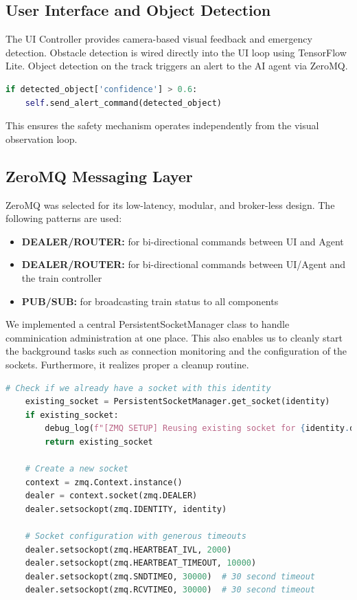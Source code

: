 \subsection{User Interface and Object Detection}

The UI Controller provides camera-based visual feedback and emergency detection. Obstacle detection is wired directly into the UI loop using TensorFlow Lite. Object detection on the track triggers an alert to the AI agent via ZeroMQ.

\begin{lstlisting}[language=Python, caption=Triggering alerts from UI]
if detected_object['confidence'] > 0.6:
    self.send_alert_command(detected_object)
\end{lstlisting}

This ensures the safety mechanism operates independently from the visual observation loop.

\subsection{ZeroMQ Messaging Layer}



ZeroMQ was selected for its low-latency, modular, and broker-less design. The following patterns are used:

\begin{itemize}
    \item \textbf{DEALER/ROUTER:} for bi-directional commands between UI and Agent
    \item \textbf{DEALER/ROUTER:} for bi-directional commands between UI/Agent and the train controller
    \item \textbf{PUB/SUB:} for broadcasting train status to all components
\end{itemize}

We implemented a central PersistentSocketManager class to handle comminication administration at  one place. This also enables us to cleanly start the background tasks such as connection monitoring and the configuration of the sockets. Furthermore, it realizes proper a cleanup routine.
\begin{lstlisting}[language=Python, caption=Snipped from socket manager]
# Check if we already have a socket with this identity
    existing_socket = PersistentSocketManager.get_socket(identity)
    if existing_socket:
        debug_log(f"[ZMQ SETUP] Reusing existing socket for {identity.decode()}")
        return existing_socket

    # Create a new socket
    context = zmq.Context.instance()
    dealer = context.socket(zmq.DEALER)
    dealer.setsockopt(zmq.IDENTITY, identity)

    # Socket configuration with generous timeouts
    dealer.setsockopt(zmq.HEARTBEAT_IVL, 2000)
    dealer.setsockopt(zmq.HEARTBEAT_TIMEOUT, 10000)
    dealer.setsockopt(zmq.SNDTIMEO, 30000)  # 30 second timeout
    dealer.setsockopt(zmq.RCVTIMEO, 30000)  # 30 second timeout
\end{lstlisting}


